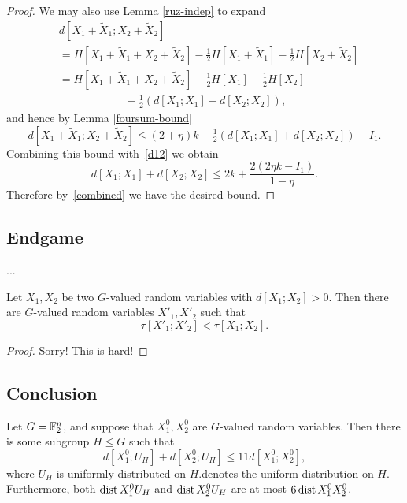 \begin{proof}
  We may also use Lemma \ref{ruz-indep} to expand
  \begin{align*}
   & d[X_1+\tilde X_1;X_2+\tilde X_2] \\ &= H[ X_1+\tilde X_1 + X_2 + \tilde X_2 ]  - \tfrac{1}{2} H[X_1+\tilde X_1] - \tfrac{1}{2} H[X_2+\tilde X_2] \\
    &= H[ X_1+\tilde X_1 + X_2 + \tilde X_2]  - \tfrac{1}{2} H[X_1] - \tfrac{1}{2} H[X_2]  \\ & \qquad\qquad\qquad   - \tfrac{1}{2} \left( d[X_1;X_1] + d[X_2; X_2] \right),
  \end{align*}
  and hence by Lemma \ref{foursum-bound}
  \[
    d[X_1+\tilde X_1; X_2+\tilde X_2] \leq (2+\eta) k - \tfrac{1}{2} \left( d[X_1;X_1] + d[X_2;X_2] \right) - I_1.
  \]
  Combining this bound with~\eqref{d12} we obtain
  \[ d[X_1;X_1] + d[X_2;X_2] \leq 2 k + \frac{2(2 \eta k - I_1)}{1-\eta}. \]
  Therefore by~\eqref{combined} we have the desired bound.
\end{proof}


\subsection{Endgame}

...

\begin{theorem}\label{de-prop}
  Let $X_1, X_2$ be two $G$-valued random variables with $d[X_1;X_2] > 0$. Then there are $G$-valued random variables $X'_1, X'_2$ such that
$$\tau[X'_1;X'_2] < \tau[X_1;X_2].
$$
\end{theorem}

\begin{proof}  Sorry!  This is hard!
\end{proof}


\subsection{Conclusion}

\begin{theorem}\label{entropy-pfr}
  Let $G = \mathbb{F}_2^n$, and suppose that $X^0_1, X^0_2$ are $G$-valued random variables.
  Then there is some subgroup $H \leq G$ such that
  \[
    d[X^0_1;U_H] + d[X^0_2;U_H] \le 11 d[X^0_1;X^0_2],
  \]
  where $U_H$ is uniformly distributed on $H$.denotes the uniform distribution on $H$.
  Furthermore, both $\operatorname{dist}{X^0_1}{U_H}$ and $\operatorname{dist}{X^0_2}{U_H}$ are at most $6 \operatorname{dist}{X^0_1}{X^0_2}$.
\end{theorem}


